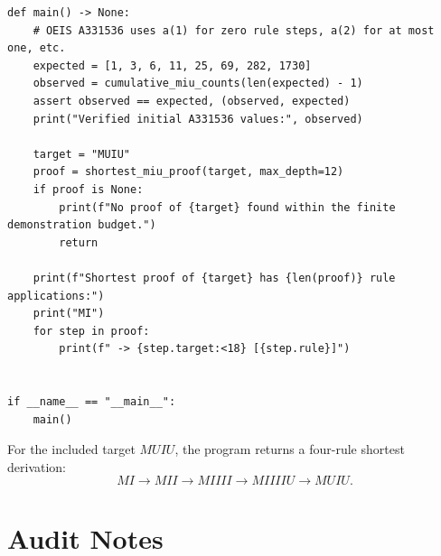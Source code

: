 \documentclass[11pt,oneside]{book}
\theoremstyle{definition}
\theoremstyle{remark}
\begin{document}
\begin{lstlisting}[style=pythonstyle]
def main() -> None:
    # OEIS A331536 uses a(1) for zero rule steps, a(2) for at most one, etc.
    expected = [1, 3, 6, 11, 25, 69, 282, 1730]
    observed = cumulative_miu_counts(len(expected) - 1)
    assert observed == expected, (observed, expected)
    print("Verified initial A331536 values:", observed)

    target = "MUIU"
    proof = shortest_miu_proof(target, max_depth=12)
    if proof is None:
        print(f"No proof of {target} found within the finite demonstration budget.")
        return

    print(f"Shortest proof of {target} has {len(proof)} rule applications:")
    print("MI")
    for step in proof:
        print(f" -> {step.target:<18} [{step.rule}]")


if __name__ == "__main__":
    main()
\end{lstlisting}

For the included target $MUIU$, the program returns a four-rule shortest derivation:
\[
MI\to MII\to MIIII\to MIIIIU\to MUIU.
\]

\chapter{Audit Notes}
\end{document}
